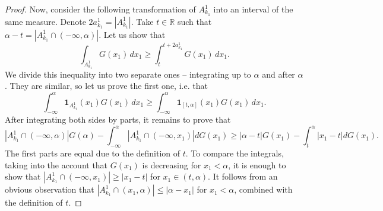 \documentclass{amsart}
\theoremstyle{remark}
\numberwithin{equation}{section}
\numberwithin{figure}{section}
\def\1{\mathbf{1}}
\begin{document}
\begin{proof}
	Now, consider the following transformation of $A_{k_1}^1$ into an interval of the same measure. Denote $2a_{k_1}^1 = |A_{k_1}^1|$. Take $t\in\mathbb{R}$ such that $\alpha - t = |A_{k_1}^1 \cap (-\infty, \alpha)|$. Let us show that
	\[
	\int_{A_{k_1}^1} G(x_1)\,dx_1 \geq \int_t^{t+2a_{k_1}^1} G(x_1)\,dx_1. 
	\]
	We divide this inequality into two separate ones -- integrating up to $\alpha$ and after $\alpha$. They are similar, so let us prove the first one, i.e. that
	\[
	\int_{-\infty}^{\alpha} \1_{A_{k_1}^1}(x_1) G(x_1) \, dx_1
	\geq \int_{-\infty}^{\alpha} \1_{[t, \alpha]}(x_1) G(x_1) \, dx_1.
	\]
	After integrating both sides by parts, it remains to prove that
	\[
	|A_{k_1}^1 \cap (-\infty, \alpha)| G(\alpha) - \int_{-\infty}^{\alpha} |A_{k_1}^1 \cap (-\infty, x_1)| dG(x_1) 
	\geq |\alpha - t| G(x_1) - \int_{t}^{\alpha} |x_1 - t| dG(x_1). 
	\]
	The first parts are equal due to the definition of $t$. To compare the integrals, taking into the account that $G(x_1)$ is decreasing for $x_1 < \alpha$, it is enough to show that $|A_{k_1}^1 \cap (-\infty, x_1)| \geq |x_1- t|$ for $x_1 \in (t, \alpha)$. It follows from an obvious observation that $|A_{k_1}^1 \cap (x_1, \alpha)| \leq |\alpha - x_1|$ for $x_1 < \alpha$, combined with the definition of $t$. 
		

\end{proof}
\end{document}
